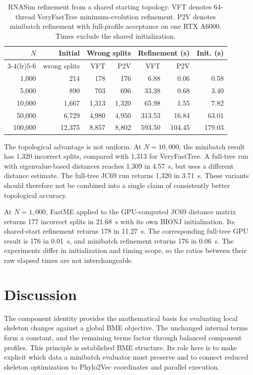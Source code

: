 \documentclass[11pt,a4paper]{article}
\makeatletter
\DeclareRobustCommand{\_}{\ifmmode\nfss@text{\textunderscore}\else\textunderscore\allowbreak\fi}
\theoremstyle{definition}
\makeatother
\begin{document}
\begin{table}[tb]
\centering
\caption{RNASim refinement from a shared starting topology. VFT denotes 64-thread VeryFastTree minimum-evolution refinement. P2V denotes minibatch refinement with full-profile acceptance on one RTX A6000. Times exclude the shared initialization.}
\label{tab:rnasim_summary}
\small
\begin{tabular}{@{}rrrrrrr@{}}
\toprule
$N$ & Initial & \multicolumn{2}{c}{Wrong splits} & \multicolumn{2}{c}{Refinement (s)} & Init. (s)\\
\cmidrule(lr){3-4}\cmidrule(lr){5-6}
 & wrong splits & VFT & P2V & VFT & P2V & \\
\midrule
1,000 & 214 & 178 & 176 & 6.88 & 0.06 & 0.58\\
5,000 & 890 & 703 & 696 & 33.38 & 0.68 & 3.40\\
10,000 & 1,667 & 1,313 & 1,320 & 65.98 & 1.55 & 7.82\\
50,000 & 6,729 & 4,980 & 4,950 & 313.53 & 16.84 & 63.01\\
100,000 & 12,375 & 8,857 & 8,802 & 593.50 & 104.45 & 179.03\\
\bottomrule
\end{tabular}
\end{table}

The topological advantage is not uniform.
At $N=10{,}000$, the minibatch result has 1,320 incorrect splits, compared with 1,313 for VeryFastTree.
A full-tree run with eigenvalue-based distances reaches 1,309 in 4.57~s, but uses a different distance estimate.
The full-tree JC69 run returns 1,320 in 3.71~s.
These variants should therefore not be combined into a single claim of consistently better topological accuracy.

At $N=1{,}000$, FastME applied to the GPU-computed JC69 distance matrix returns 177 incorrect splits in 21.68~s with its own BIONJ initialization.
Its shared-start refinement returns 178 in 11.27~s.
The corresponding full-tree GPU result is 176 in 0.01~s, and minibatch refinement returns 176 in 0.06~s.
The experiments differ in initialization and timing scope, so the ratios between their raw elapsed times are not interchangeable.

\section{Discussion}

The component identity provides the mathematical basis for evaluating local skeleton changes against a global BME objective.
The unchanged internal terms form a constant, and the remaining terms factor through balanced component profiles.
This principle is established BME structure.
Its role here is to make explicit which data a minibatch evaluator must preserve and to connect reduced skeleton optimization to Phylo2Vec coordinates and parallel execution.
\end{document}
